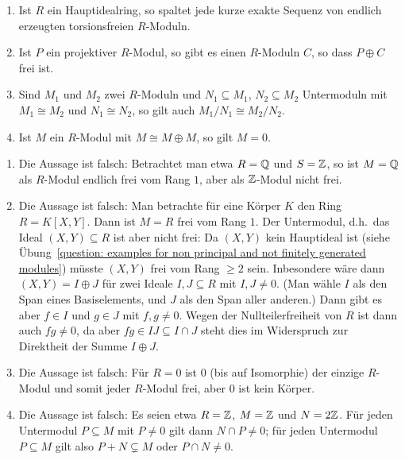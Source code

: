 \begin{question}[subtitle = Multiple Choice]
\begin{enumerate}
    \item
      Ist $R$ ein Hauptidealring, so spaltet jede kurze exakte Sequenz von endlich erzeugten torsionsfreien $R$-Moduln.
    \item
      Ist $P$ ein projektiver $R$-Modul, so gibt es einen $R$-Moduln $C$, so dass $P \oplus C$ frei ist.
    \item
      Sind $M_1$ und $M_2$ zwei $R$-Moduln und $N_1 \subseteq M_1$, $N_2 \subseteq M_2$ Untermoduln mit $M_1 \cong M_2$ und $N_1 \cong N_2$, so gilt auch $M_1/N_1 \cong M_2/N_2$.
    \item
      Ist $M$ ein $R$-Modul mit $M \cong M \oplus M$, so gilt $M = 0$.
  \end{enumerate}
\end{question}


\begin{solution}
  \begin{enumerate}
    \item
      Die Aussage ist falsch:
      Betrachtet man etwa $R = \mathbb{Q}$ und $S = \mathbb{Z}$, so ist $M = \mathbb{Q}$ als $R$-Modul endlich frei vom Rang $1$, aber als $\mathbb{Z}$-Modul nicht frei.
      
    \item
      Die Aussage ist falsch:
      Man betrachte für eine Körper $K$ den Ring $R = K[X,Y]$.
      Dann ist $M = R$ frei vom Rang $1$.
      Der Untermodul, d.h.\ das Ideal $(X,Y) \subseteq R$ ist aber nicht frei:
      Da $(X,Y)$ kein Hauptideal ist (siehe Übung~\ref{question: examples for non principal and not finitely generated modules}) müsste $(X,Y)$ frei vom Rang $\geq 2$ sein.
      Inbesondere wäre dann $(X,Y) = I \oplus J$ für zwei Ideale $I, J \subseteq R$ mit $I, J \neq 0$.
      (Man wähle $I$ als den Span eines Basiselements, und $J$ als den Span aller anderen.)
      Dann gibt es aber $f \in I$ und $g \in J$ mit $f, g \neq 0$.
      Wegen der Nullteilerfreiheit von $R$ ist dann auch $fg \neq 0$, da aber $fg \in IJ \subseteq I \cap J$ steht dies im Widerspruch zur Direktheit der Summe $I \oplus J$.
      
    \item
      Die Aussage ist falsch:
      Für $R = 0$ ist $0$ (bis auf Isomorphie) der einzige $R$-Modul und somit jeder $R$-Modul frei, aber $0$ ist kein Körper.
      
    \item
      Die Aussage ist falsch:
      Es seien etwa $R = \mathbb{Z}$, $M = \mathbb{Z}$ und $N = 2\mathbb{Z}$.
      Für jeden Untermodul $P \subseteq M$ mit $P \neq 0$ gilt dann $N \cap P \neq 0$;
      für jeden Untermodul $P \subseteq M$ gilt also $P + N \subsetneq M$ oder $P \cap N \neq 0$.
      

\end{enumerate}
\end{solution}
